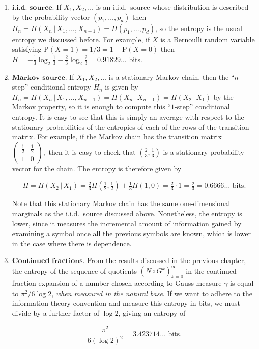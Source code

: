 \documentclass[11pt]{report}
\theoremstyle{plain}
\theoremstyle{definition}
\begin{document}
\begin{enumerate}[label=\arabic*.]
\item $\textbf{i.i.d. source.}$ If $X_1,X_2,\ldots$ is an i.i.d.\ source whose distribution is described by the probability vector $(p_1,\ldots,p_d)$ then $H_n=H(X_n\,|\,X_1,\ldots,X_{n-1})=H(p_1,\ldots,p_d)$, so the entropy is the usual entropy we discussed before. For example, if $X$ is a Bernoulli random variable satisfying $\mathrm{P}(X=1)=1/3=1-\mathrm{P}(X=0)$ then $H=-\tfrac13 \log_2 \tfrac13 - \tfrac23 \log_2 \tfrac23 = 0.91829\ldots$ bits.
\item $\textbf{Markov source.}$ If $X_1,X_2,\ldots$ is a stationary Markov chain, then the ``$n$-step'' conditional entropy $H_n$ is given by $H_n=H(X_n\,|\,X_1,\ldots,X_{n-1})= H(X_n\,|\,X_{n-1}) = H(X_2\,|\,X_1)$ by the Markov property, so it is enough to compute this ``$1$-step'' conditional entropy. It is easy to see that this is simply an average with respect to the stationary probabilities of the entropies of each of the rows of the transition matrix. For example, if the Markov chain has the transition matrix $\left( \begin{array}{cc} \tfrac12 & \tfrac12 \\ 1&0 \end{array} \right),$ then it is easy to check that $(\tfrac23,\tfrac13)$ is a stationary probability vector for the chain. The entropy is therefore given by

\[
H = H(X_2\,|\,X_1) = \tfrac23 H(\tfrac12,\tfrac12) + \tfrac13 H(1,0) = \tfrac23 \cdot 1 = \tfrac 23 = 0.6666\ldots \textrm{ bits}.
\]

Note that this stationary Markov chain has the same one-dimensional marginals as the i.i.d.\ source discussed above. Nonetheless, the entropy is lower, since it measures the incremental amount of information gained by examining a symbol once all the previous symbols are known, which is lower in the case where there is dependence.
\item $\textbf{Continued fractions.}$ From the results discussed in the previous chapter, the entropy of the sequence of quotients $(N\circ G^k)_{k=0}^\infty$ in the continued fraction expansion of a number chosen according to Gauss measure $\gamma$ is equal to $\pi^2/6\log 2$, \emph{when measured in the natural base}. If we want to adhere to the information theory convention and measure this entropy in bits, we must divide by a further factor of $\log 2$, giving an entropy of

\[
\frac{\pi^2}{6(\log 2)^2} = 3.423714\ldots \textrm{ bits}.
\]


\end{enumerate}
\end{document}

